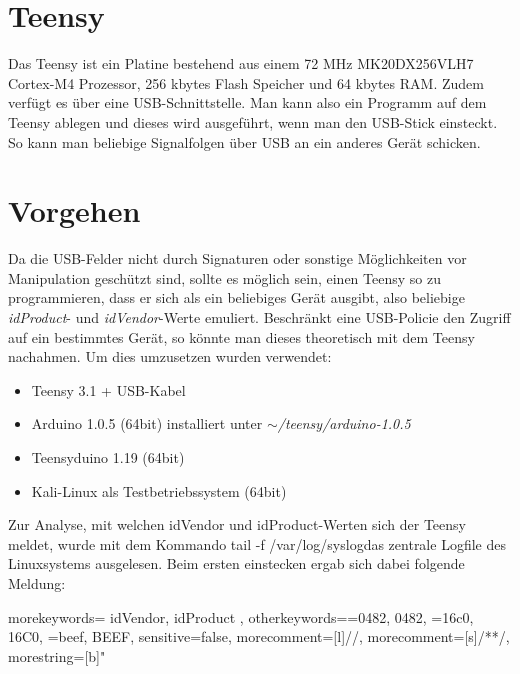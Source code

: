 \section{Teensy}
Das Teensy ist ein Platine bestehend aus einem 72 MHz MK20DX256VLH7 Cortex-M4 Prozessor, 256 kbytes Flash Speicher und 64 kbytes RAM. Zudem verfügt es über eine USB-Schnittstelle. Man kann also ein Programm auf dem Teensy ablegen und dieses wird ausgeführt, wenn man den USB-Stick einsteckt. So kann man beliebige Signalfolgen über USB an ein anderes Gerät schicken.
			
\section{Vorgehen}
Da die USB-Felder nicht durch Signaturen oder sonstige Möglichkeiten vor Manipulation geschützt sind, sollte es möglich sein, einen Teensy so zu programmieren, dass er sich als ein beliebiges Gerät ausgibt, also beliebige \textit{idProduct}- und \textit{idVendor}-Werte emuliert. Beschränkt eine USB-Policie den Zugriff auf ein bestimmtes Gerät, so könnte man dieses theoretisch mit dem Teensy nachahmen. 
Um dies umzusetzen wurden verwendet:

\begin{itemize}
	\item Teensy 3.1 + USB-Kabel
	\item Arduino 1.0.5 (64bit) installiert unter \textit{$\sim$/teensy/arduino-1.0.5}
	\item Teensyduino 1.19 (64bit)
	\item Kali-Linux als Testbetriebssystem (64bit)
\end{itemize}

Zur Analyse, mit welchen idVendor und idProduct-Werten sich der Teensy meldet, wurde mit dem Kommando \glqq tail -f /var/log/syslog\grqq das zentrale Logfile des Linuxsystems ausgelesen. Beim ersten einstecken ergab sich dabei folgende Meldung:
	
{
  morekeywords={
    idVendor,
    idProduct
  },
  otherkeywords={=0482, 0482, =16c0, 16C0, =beef, BEEF},
  sensitive=false, %
  morecomment=[l]{//}, %
  morecomment=[s]{/*}{*/}, %
  morestring=[b]" %
}
\lstset{language=log}



